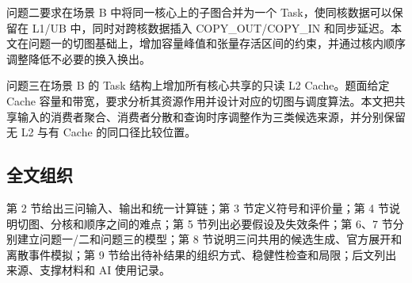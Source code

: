 问题二要求在场景 B 中将同一核心上的子图合并为一个 Task，使同核数据可以保留在 L1/UB 中，同时对跨核数据插入 COPY\_OUT/COPY\_IN 和同步延迟。本文在问题一的切图基础上，增加容量峰值和张量存活区间的约束，并通过核内顺序调整降低不必要的换入换出。

问题三在场景 B 的 Task 结构上增加所有核心共享的只读 L2 Cache。题面给定 Cache 容量和带宽，要求分析其资源作用并设计对应的切图与调度算法。本文把共享输入的消费者聚合、消费者分散和查询时序调整作为三类候选来源，并分别保留无 L2 与有 Cache 的同口径比较位置。

\subsection{全文组织}
第 2 节给出三问输入、输出和统一计算链；第 3 节定义符号和评价量；第 4 节说明切图、分核和顺序之间的难点；第 5 节列出必要假设及失效条件；第 6、7 节分别建立问题一/二和问题三的模型；第 8 节说明三问共用的候选生成、官方展开和离散事件模拟；第 9 节给出待补结果的组织方式、稳健性检查和局限；后文列出来源、支撑材料和 AI 使用记录。
